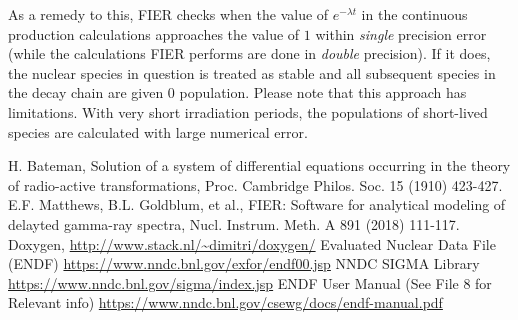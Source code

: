 \documentclass{article}
\begin{document}
\noindent As a remedy to this, FIER checks when the value of $e^{-\lambda t}$ in the continuous production calculations approaches the value of $1$ within \textit{single} precision error (while the calculations FIER performs are done in \textit{double} precision). If it does, the nuclear species in question is treated as stable and all subsequent species in the decay chain are given $0$ population. Please note that this approach has limitations. With very short irradiation periods, the populations of short-lived species are calculated with large numerical error. 
\newpage
\begin{thebibliography}{999}

H. Bateman, Solution of a system of differential equations occurring in the theory of radio-active transformations, Proc. Cambridge Philos. Soc. 15 (1910) 423-427. 
E.F. Matthews, B.L. Goldblum, et al., FIER: Software for analytical modeling of delayted gamma-ray spectra, Nucl. Instrum. Meth. A 891 (2018) 111-117.
Doxygen, \url{http://www.stack.nl/~dimitri/doxygen/}
Evaluated Nuclear Data File (ENDF)
\url{https://www.nndc.bnl.gov/exfor/endf00.jsp}
NNDC SIGMA Library
\url{https://www.nndc.bnl.gov/sigma/index.jsp}
ENDF User Manual (See File 8 for Relevant info)
\url{https://www.nndc.bnl.gov/csewg/docs/endf-manual.pdf}
\end{thebibliography}
\end{document}
